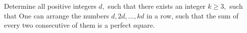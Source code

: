 Determine all positive integers $d,$ such that there exists an integer $k\geq 3,$ such that
One can arrange the numbers $d,2d,\ldots,kd$ in a row, such that the sum of every two consecutive of them is a perfect square.